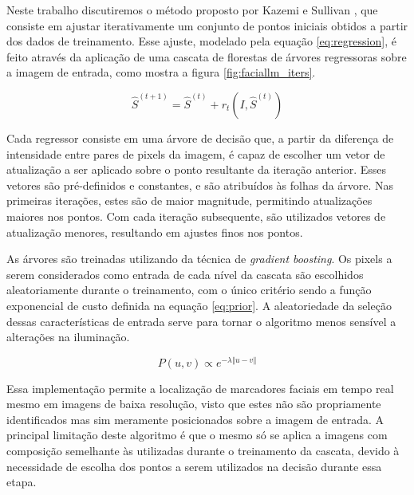 Neste trabalho discutiremos o método proposto por Kazemi e Sullivan \cite{kazemiOneMillisecondFace2014}, que consiste em ajustar iterativamente um conjunto de pontos iniciais obtidos a partir dos dados de treinamento.
Esse ajuste, modelado pela equação \ref{eq:regression}, é feito através da aplicação de uma cascata de florestas de árvores regressoras sobre a imagem de entrada, como mostra a figura \ref{fig:faciallm_iters}.

\begin{equation}\label{eq:regression}
    \hat{S}^{\left( t+1 \right)} = \hat{S}^{\left( t \right)} + r_t(I, \hat{S}^{\left( t \right)})
\end{equation}

Cada regressor consiste em uma árvore de decisão que, a partir da diferença de intensidade entre pares de pixels da imagem, é capaz de escolher um vetor de atualização a ser aplicado sobre o ponto resultante da iteração anterior.
Esses vetores são pré-definidos e constantes, e são atribuídos às folhas da árvore.
Nas primeiras iterações, estes são de maior magnitude, permitindo atualizações maiores nos pontos.
Com cada iteração subsequente, são utilizados vetores de atualização menores, resultando em ajustes finos nos pontos.

As árvores são treinadas utilizando da técnica de \textit{gradient boosting}.
Os pixels a serem considerados como entrada de cada nível da cascata são escolhidos aleatoriamente durante o treinamento, com o único critério sendo a função exponencial de custo definida na equação \ref{eq:prior}.
A aleatoriedade da seleção dessas características de entrada serve para tornar o algoritmo menos sensível a alterações na iluminação.

\begin{equation}\label{eq:prior}
    P(u,v) \propto e^{ -\lambda \left\Vert u-v \right\Vert }
\end{equation}

Essa implementação permite a localização de marcadores faciais em tempo real mesmo em imagens de baixa resolução, visto que estes não são propriamente identificados mas sim meramente posicionados sobre a imagem de entrada.
A principal limitação deste algoritmo é que o mesmo só se aplica a imagens com composição semelhante às utilizadas durante o treinamento da cascata, devido à necessidade de escolha dos pontos a serem utilizados na decisão durante essa etapa.